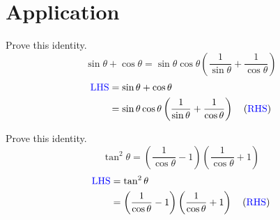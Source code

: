 \documentclass{article}
\begin{document}
\section{Application}
\begin{multienum}
    \item Prove this identity.
    $$
    \sin \theta+\cos \theta=\sin \theta \cos \theta\left(\frac{1}{\sin \theta}+\frac{1}{\cos \theta}\right)
    $$
    \begin{align*}
        \text{\textcolor{blue}{LHS}} &= \sin \theta+\cos \theta \\
        &= \sin \theta \cos \theta\left(\frac{1}{\sin \theta}+\frac{1}{\cos \theta}\right) \quad (\text{\textcolor{blue}{RHS}})
    \end{align*}

    \item Prove this identity.
    $$
    \tan ^2 \theta=\left(\frac{1}{\cos \theta}-1\right)\left(\frac{1}{\cos \theta}+1\right)
    $$
    \begin{align*}
        \text{\textcolor{blue}{LHS}} &= \tan ^2 \theta \\
        &= \left(\frac{1}{\cos \theta}-1\right)\left(\frac{1}{\cos \theta}+1\right) \quad (\text{\textcolor{blue}{RHS}})
    \end{align*}
\end{multienum}
\end{document}
